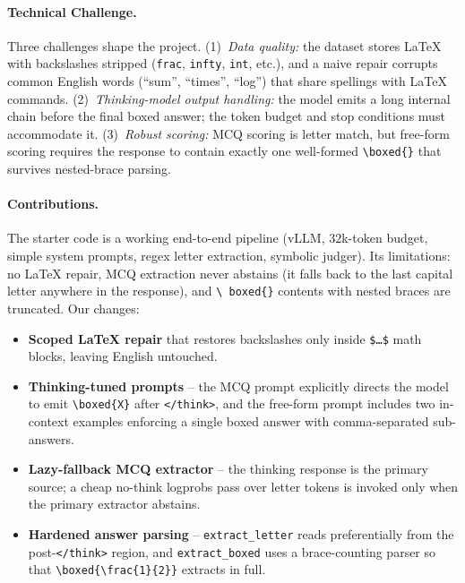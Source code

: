 \documentclass{article}
\begin{document}
\paragraph{Technical Challenge.}
Three challenges shape the project. (1)~\textit{Data quality:} the dataset
stores LaTeX with backslashes stripped (\texttt{frac}, \texttt{infty},
\texttt{int}, etc.), and a naive repair corrupts common English words
(``sum'', ``times'', ``log'') that share spellings with LaTeX commands.
(2)~\textit{Thinking-model output handling:} the model emits a long internal
chain before the final boxed answer; the token budget and stop conditions
must accommodate it. (3)~\textit{Robust scoring:} MCQ scoring is letter
match, but free-form scoring requires the response to contain exactly one
well-formed \texttt{\textbackslash boxed\{\}} that survives nested-brace
parsing.

\paragraph{Contributions.}
The starter code is a working end-to-end pipeline (vLLM, $32$k-token budget,
simple system prompts, regex letter extraction, symbolic judger). Its
limitations: no LaTeX repair, MCQ extraction never abstains (it falls back to
the last capital letter anywhere in the response), and \texttt{\textbackslash
boxed\{\}} contents with nested braces are truncated. Our changes:
\begin{itemize}
  \item \textbf{Scoped LaTeX repair} that restores backslashes only inside
    \texttt{\$\ldots\$} math blocks, leaving English untouched.
  \item \textbf{Thinking-tuned prompts} -- the MCQ prompt explicitly directs
    the model to emit \texttt{\textbackslash boxed\{X\}} after
    \texttt{</think>}, and the free-form prompt includes two in-context
    examples enforcing a single boxed answer with comma-separated
    sub-answers.
  \item \textbf{Lazy-fallback MCQ extractor} -- the thinking response is the
    primary source; a cheap no-think logprobs pass over letter tokens is
    invoked only when the primary extractor abstains.
  \item \textbf{Hardened answer parsing} -- \texttt{extract\_letter} reads
    preferentially from the post-\texttt{</think>} region, and
    \texttt{extract\_boxed} uses a brace-counting parser so that
    \texttt{\textbackslash boxed\{\textbackslash frac\{1\}\{2\}\}} extracts
    in full.
\end{itemize}
\end{document}
